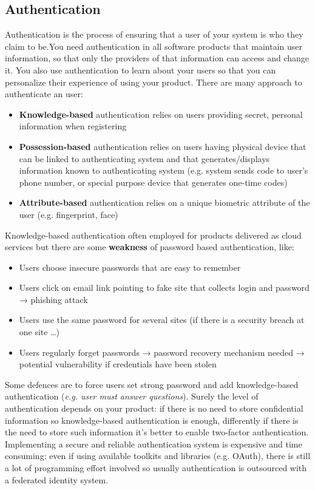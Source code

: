 \documentclass[10pt,a4paper]{report}
\begin{document}
\subsection{Authentication}
Authentication is the process of ensuring that a user of your system is who they claim to be.You need authentication in all software products that maintain user information, so that only the providers of that information can access and change it. You also use authentication to learn about your users so that you can
personalize their experience of using your product.
There are many approach to authenticate an user:
\begin{itemize}
	\item \textbf{Knowledge-based} authentication relies on users providing secret, personal
	information when registering
	\item \textbf{Possession-based} authentication relies on users having physical device that can be
	linked to authenticating system and that generates/displays information known to
	authenticating system (e.g. system sends code to user’s phone number, or special purpose device that generates one-time codes)
	\item \textbf{Attribute-based} authentication relies on a unique biometric attribute of the user (e.g.
	fingerprint, face) 
\end{itemize}
Knowledge-based authentication often employed for products delivered as cloud services but there are some \textbf{weakness} of password based authentication, like:
\begin{itemize}
	\item Users choose insecure passwords that are easy to remember
	\item Users click on email link pointing to fake site that collects login and password → phishing attack
	\item Users use the same password for several sites (if there is a security breach at one site …)
	\item Users regularly forget passwords → password recovery mechanism needed → potential vulnerability if
	credentials have been stolen
\end{itemize}
Some defences are to force users set strong password and add knowledge-based authentication (\textit{e.g. user must answer questions}). Surely the level of authentication depends on your product: if there is no need to store confidential information so knowledge-based authentication is enough, differently if there is the need to store such information it's better to enable two-factor authentication.\\
Implementing a secure and reliable authentication system is expensive and time consuming: even if using available toolkits and libraries (e.g. OAuth), there is still a lot of programming effort involved so usually authentication is outsourced with a federated identity system.
\end{document}
